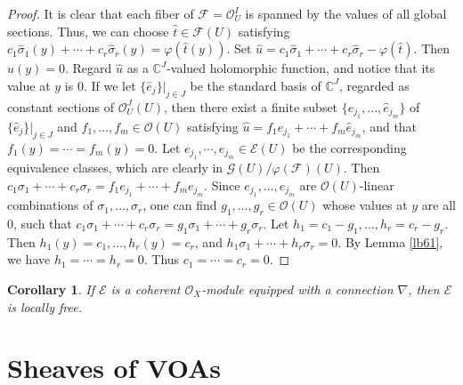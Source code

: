 \documentclass[12pt,b5paper,notitlepage]{report}
\theoremstyle{definition}
\theoremstyle{plain}
\newtheorem{co}[df]{Corollary}
\newcommand{\wht}{\widehat}
\newcommand{\scr}{\mathscr}
\newcommand{\Cbb}{\mathbb C}
\numberwithin{equation}{section}
\begin{document}
\begin{proof}
It is clear that each fiber of $\scr F=\scr O_U^I$ is spanned by the values of all global sections. Thus, we can choose $\wht t\in\scr F(U)$ satisfying $c_1\wht \sigma_1(y)+\cdots+c_r\wht \sigma_r(y)=\varphi(\wht t(y))$. Set $\wht u=c_1\wht \sigma_1+\cdots+c_r\wht \sigma_r-\varphi(\wht t)$. Then $\wht u(y)=0$. Regard $\wht u$ as a $\Cbb^J$-valued holomorphic function, and notice that its value at $y$ is $0$. If we let $\{\wht e_j\}|_{j\in J}$ be the standard basis of $\Cbb^J$, regarded as constant sections of $\scr O_U^J(U)$, then there exist a finite subset $\{\wht e_{j_1},\dots,\wht e_{j_m}\}$ of $\{\wht e_j\}|_{j\in J}$ and $f_1,\dots,f_m\in\scr O(U)$ satisfying $\wht u=f_1\wht e_{j_1}+\cdots+f_m\wht e_{j_m}$, and that $f_1(y)=\cdots=f_m(y)=0$. Let $e_{j_1},\cdots,e_{j_m}\in \scr E(U)$ be the corresponding equivalence classes, which are clearly in $\scr G(U)/\varphi(\scr F)(U)$. Then $c_1\sigma_1+\cdots+c_r\sigma_r=f_1e_{j_1}+\cdots+f_me_{j_m}$. Since  $e_{j_1},\dots,e_{j_m}$ are $\scr O(U)$-linear combinations of $\sigma_1,\dots,\sigma_r$, one can find $g_1,\dots,g_r\in\scr O(U)$ whose values at $y$ are all $0$, such that $c_1\sigma_1+\cdots+c_r\sigma_r=g_1\sigma_1+\cdots+g_r\sigma_r$. Let $h_1=c_1-g_1,\dots,h_r=c_r-g_r$. Then $h_1(y)=c_1,\dots,h_r(y)=c_r$, and $h_1\sigma_1+\cdots+h_r\sigma_r=0$. By Lemma \ref{lb61}, we have $h_1=\cdots=h_r=0$. Thus $c_1=\cdots=c_r=0$.
\end{proof}


\begin{co}
If $\scr E$ is a coherent $\scr O_X$-module equipped with a connection $\nabla$, then $\scr E$ is locally free.
\end{co}

















\chapter{Sheaves of VOAs}\label{lb90}
\end{document}
